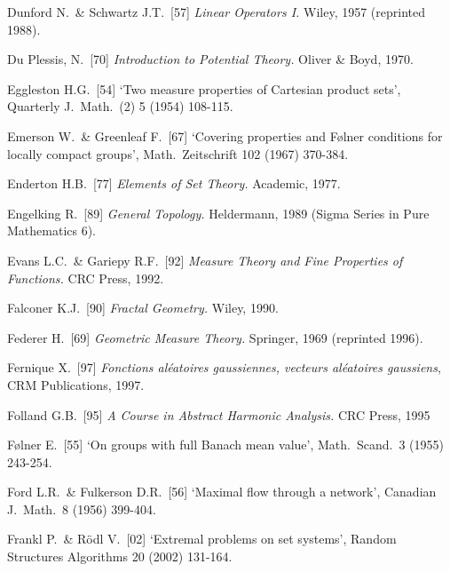 {Dunford N.\ \& Schwartz J.T.\ [57] {\it Linear Operators I.}  Wiley,
1957 (reprinted 1988).
\cmmnt{[\S4A4.]}

Du Plessis, N.\ [70] {\it Introduction to Potential Theory.}  Oliver \&
Boyd, 1970.

\medskip%

Eggleston H.G.\ [54] `Two measure properties of Cartesian product sets',
Quarterly J.\ Math.\ (2) 5 (1954) 108-115.
\cmmnt{[498B.]}

Emerson W.\ \& Greenleaf F.\ [67] `Covering properties and F{\o}lner
conditions for locally compact groups',
Math.\ Zeitschrift 102 (1967) 370-384.
\cmmnt{[449J.]}

Enderton H.B.\ [77] {\it Elements of Set Theory.}   Academic, 1977.
\cmmnt{[4A1A.]}

Engelking R.\ [89] {\it General Topology.} Heldermann, 1989 (Sigma
Series in Pure Mathematics 6).

Evans L.C.\ \& Gariepy R.F.\ [92] {\it Measure Theory and Fine
Properties of Functions.}   CRC Press, 1992.

\medskip%

Falconer K.J.\ [90] {\it Fractal Geometry.}  Wiley, 1990.
\cmmnt{[\S471 {\it intro.}]}

Federer H.\ [69] {\it Geometric Measure Theory.}
Springer, 1969 (reprinted 1996).

Fernique X.\ [97] {\it Fonctions al\'eatoires gaussiennes,
vecteurs al\'eatoires gaussiens}, CRM Publications, 1997.
\cmmnt{[\S456 {\it notes\/}.]}

Folland G.B.\ [95] {\it A Course in Abstract Harmonic Analysis.}   CRC
Press, 1995
\cmmnt{[\S4A5, \S4A6.]}

F{\o}lner E.\ [55] `On groups with full Banach mean value', 
Math.\ Scand.\ 3 (1955) 243-254.
\cmmnt{[\S449 {\it notes\/}.]}

Ford L.R.\ \& Fulkerson D.R.\ [56] `Maximal flow through a network',
Canadian J.\ Math.\ 8 (1956) 399-404.
\cmmnt{[4A4N.]}

Frankl P.\ \& R\"odl V.\ [02] `Extremal problems on set systems',
Random Structures Algorithms 20 (2002) 131-164.
\cmmnt{[497L.]}

}

